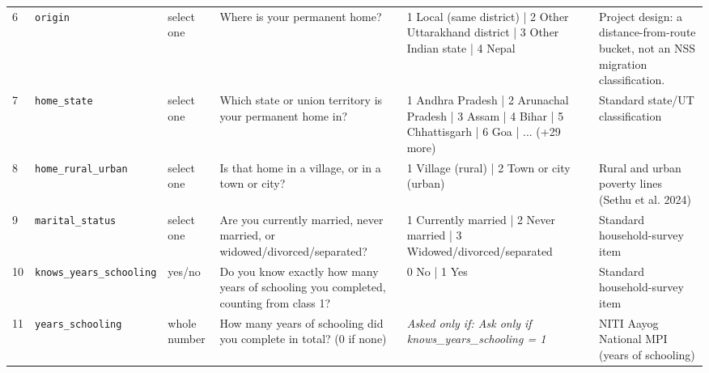 \documentclass[9pt,a4paper,landscape]{article}
\begin{document}
\begin{longtable}{@{}p{0.5cm}p{3.3cm}p{1.7cm}p{7.3cm}p{5.6cm}p{5.4cm}@{}}
\footnotesize 6 & \footnotesize\texttt{origin} & \scriptsize select one & \footnotesize Where is your permanent home?\par\vspace{1pt}{\footnotesize\color{hdr}{\hifont आपका पक्का घर कहाँ है?}} & \scriptsize 1 Local (same district) | 2 Other Uttarakhand district | 3 Other Indian state | 4 Nepal & \scriptsize Project design: a distance-from-route bucket, not an NSS migration classification.\\
\footnotesize 7 & \footnotesize\texttt{home\_state} & \scriptsize select one & \footnotesize Which state or union territory is your permanent home in?\par\vspace{1pt}{\footnotesize\color{hdr}{\hifont वह घर किस राज्य में है? (अगर भारत से बाहर है तो वह बताइए।)}} & \scriptsize 1 Andhra Pradesh | 2 Arunachal Pradesh | 3 Assam | 4 Bihar | 5 Chhattisgarh | 6 Goa | ... (+29 more) & \scriptsize Standard state/UT classification\\
\footnotesize 8 & \footnotesize\texttt{home\_rural\_urban} & \scriptsize select one & \footnotesize Is that home in a village, or in a town or city?\par\vspace{1pt}{\footnotesize\color{hdr}{\hifont वह घर गाँव में है, या क़स्बे या शहर में?}} & \scriptsize 1 Village (rural) | 2 Town or city (urban) & \scriptsize Rural and urban poverty lines (Sethu et al. 2024)\\
\footnotesize 9 & \footnotesize\texttt{marital\_status} & \scriptsize select one & \footnotesize Are you currently married, never married, or widowed/divorced/separated?\par\vspace{1pt}{\footnotesize\color{hdr}{\hifont क्या आपकी शादी हुई है, नहीं हुई है, या आप विधवा/विधुर या अलग हैं?}} & \scriptsize 1 Currently married | 2 Never married | 3 Widowed/divorced/separated & \scriptsize Standard household-survey item\\
\footnotesize 10 & \footnotesize\texttt{knows\_years\_schooling} & \scriptsize yes/no & \footnotesize Do you know exactly how many years of schooling you completed, counting from class 1?\par\vspace{1pt}{\footnotesize\color{hdr}{\hifont क्या आपको ठीक-ठीक याद है कि आपने कितने साल पढ़ाई की, कक्षा 1 से गिनकर?}} & \scriptsize 0 No | 1 Yes & \scriptsize Standard household-survey item\\
\footnotesize 11 & \footnotesize\texttt{years\_schooling} & \scriptsize whole number & \footnotesize How many years of schooling did you complete in total? (0 if none)\par\vspace{1pt}{\footnotesize\color{hdr}{\hifont आपने कुल कितने साल पढ़ाई की? (अगर बिल्कुल नहीं पढ़े तो 0)}} & \scriptsize \textit{Asked only if: Ask only if knows\_years\_schooling = 1} & \scriptsize NITI Aayog National MPI (years of schooling)\\

\end{longtable}
\end{document}
